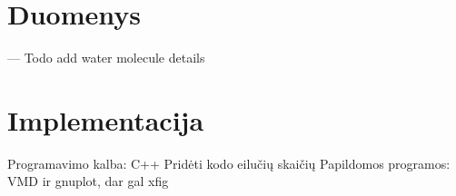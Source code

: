 \documentclass[a4paper,12pt,fleqn,tikz]{article}
\begin{document}
    \section{Duomenys}
    \label{sec:data}

    --- Todo add water molecule details


    \newpage
    \section{Implementacija}
    \label{sec:algorithm_implementation}
    Programavimo kalba: C++
    Pridėti kodo eilučių skaičių
    Papildomos programos: VMD ir gnuplot, dar gal xfig


    \label{sec:implementation}
    



    

    


\end{document}

